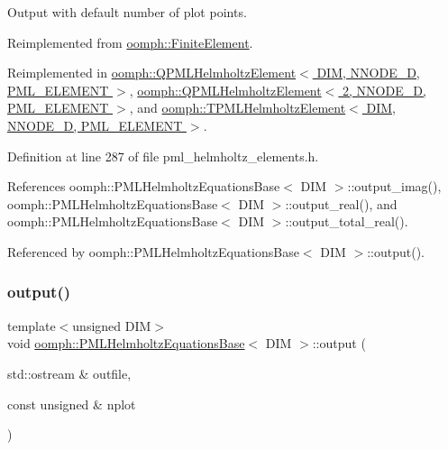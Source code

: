 Output with default number of plot points. 



Reimplemented from \hyperlink{classoomph_1_1FiniteElement_a2ad98a3d2ef4999f1bef62c0ff13f2a7}{oomph\+::\+Finite\+Element}.



Reimplemented in \hyperlink{classoomph_1_1QPMLHelmholtzElement_af05911b64893f693f25097dffa6a4955}{oomph\+::\+Q\+P\+M\+L\+Helmholtz\+Element$<$ D\+I\+M, N\+N\+O\+D\+E\+\_\+D, P\+M\+L\+\_\+\+E\+L\+E\+M\+E\+N\+T $>$}, \hyperlink{classoomph_1_1QPMLHelmholtzElement_af05911b64893f693f25097dffa6a4955}{oomph\+::\+Q\+P\+M\+L\+Helmholtz\+Element$<$ 2, N\+N\+O\+D\+E\+\_\+D, P\+M\+L\+\_\+\+E\+L\+E\+M\+E\+N\+T $>$}, and \hyperlink{classoomph_1_1TPMLHelmholtzElement_a9dbd17c84f5b1f058ba8373daa03f7cd}{oomph\+::\+T\+P\+M\+L\+Helmholtz\+Element$<$ D\+I\+M, N\+N\+O\+D\+E\+\_\+D, P\+M\+L\+\_\+\+E\+L\+E\+M\+E\+N\+T $>$}.



Definition at line 287 of file pml\+\_\+helmholtz\+\_\+elements.\+h.



References oomph\+::\+P\+M\+L\+Helmholtz\+Equations\+Base$<$ D\+I\+M $>$\+::output\+\_\+imag(), oomph\+::\+P\+M\+L\+Helmholtz\+Equations\+Base$<$ D\+I\+M $>$\+::output\+\_\+real(), and oomph\+::\+P\+M\+L\+Helmholtz\+Equations\+Base$<$ D\+I\+M $>$\+::output\+\_\+total\+\_\+real().



Referenced by oomph\+::\+P\+M\+L\+Helmholtz\+Equations\+Base$<$ D\+I\+M $>$\+::output().

\mbox{\label{classoomph_1_1PMLHelmholtzEquationsBase_a904736450d231513640224020566460f}} 
\subsubsection{\texorpdfstring{output()}{output()}\hspace{0.1cm}{\footnotesize\ttfamily [2/4]}}
{\footnotesize\ttfamily template$<$unsigned D\+IM$>$ \\
void \hyperlink{classoomph_1_1PMLHelmholtzEquationsBase}{oomph\+::\+P\+M\+L\+Helmholtz\+Equations\+Base}$<$ D\+IM $>$\+::output (\begin{DoxyParamCaption}\item[{std\+::ostream \&}]{outfile,  }\item[{const unsigned \&}]{nplot }\end{DoxyParamCaption})\hspace{0.3cm}{\ttfamily [virtual]}}



